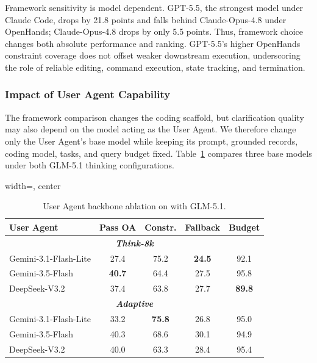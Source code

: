 Framework sensitivity is model dependent. GPT-5.5, the strongest model under Claude Code, drops by 21.8 points and falls behind Claude-Opus-4.8 under OpenHands; Claude-Opus-4.8 drops by only 5.5 points. Thus, framework choice changes both absolute performance and ranking. GPT-5.5's higher OpenHands constraint coverage does not offset weaker downstream execution, underscoring the role of reliable editing, command execution, state tracking, and termination.

\subsubsection{Impact of User Agent Capability}
\label{sec:user-agent-capability}

The framework comparison changes the coding scaffold, but clarification quality may also depend on the model acting as the User Agent. We therefore change only the User Agent's base model while keeping its prompt, grounded records, coding model, tasks, and query budget fixed. Table~\ref{tab:user-agent-ablation} compares three base models under both GLM-5.1 thinking configurations.

\begin{table}[t]
\centering
\caption{User Agent backbone ablation on \rcblite{} with GLM-5.1.}
\label{tab:user-agent-ablation}
\small
\begin{adjustbox}{width=\linewidth, center}
\begin{tabular}{lcccc}
\toprule
User Agent & Pass OA & Constr. & Fallback & Budget \\
\midrule
\multicolumn{5}{c}{\textbf{\textit{Think-8k}}} \\
\midrule
Gemini-3.1-Flash-Lite & 27.4 & 75.2 & \textbf{24.5} & 92.1 \\
Gemini-3.5-Flash & \textbf{40.7} & 64.4 & 27.5 & 95.8 \\
DeepSeek-V3.2 & 37.4 & 63.8 & 27.7 & \textbf{89.8} \\
\midrule
\multicolumn{5}{c}{\textbf{\textit{Adaptive}}} \\
\midrule
Gemini-3.1-Flash-Lite & 33.2 & \textbf{75.8} & 26.8 & 95.0 \\
Gemini-3.5-Flash & 40.3 & 68.6 & 30.1 & 94.9 \\
DeepSeek-V3.2 & 40.0 & 63.3 & 28.4 & 95.4 \\
\bottomrule
\end{tabular}
\end{adjustbox}
\end{table}

